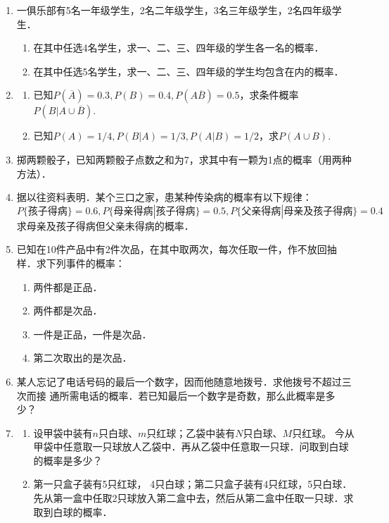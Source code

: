 \documentclass[10pt,a4paper]{article}
\begin{document}
\begin{enumerate}
    \item 一俱乐部有5名一年级学生，2名二年级学生，3名三年级学生，2名四年级学生．
    \begin{enumerate}
        \item 在其中任选4名学生，求一、二、三、四年级的学生各一名的概率．
        \item 在其中任选5名学生，求一、二、三、四年级的学生均包含在内的概率．
    \end{enumerate}


    \item \begin{enumerate}
        \item 已知$P(\overline{A})=0.3,P(B)=0.4,P(A\overline{B})=0.5$，求条件概率$P(B|A\cup \overline{B})$.
        \item 已知$P(A)=1/4,P(B|A)=1/3,P(A|B)=1/2$，求$P(A\cup B)$.
    \end{enumerate}


    \item 掷两颗骰子，已知两颗骰子点数之和为7，求其中有一颗为1点的概率（用两种方法）．
    

    \item 据以往资料表明．某个三口之家，患某种传染病的概率有以下规律：
    $$P\{\mbox{孩子得病}\}=0.6,P\{\mbox{母亲得病}|\mbox{孩子得病}\}=0.5,P\{\mbox{父亲得病}|\mbox{母亲及孩子得病}\}=0.4$$
    求母亲及孩子得病但父亲未得病的概率．


    \item 已知在10件产品中有2件次品，在其中取两次，每次任取一件，作不放回抽样．求下列事件的概率：
    \begin{enumerate}
        \item 两件都是正品．
        \item 两件都是次品．
        \item 一件是正品，一件是次品．
        \item 第二次取出的是次品．
    \end{enumerate}


    \item 某人忘记了电话号码的最后一个数字，因而他随意地拨号．求他拨号不超过三次而接
    通所需电话的概率．若已知最后一个数字是奇数，那么此概率是多少？


    \item \begin{enumerate}
        \item 设甲袋中装有$n$只白球、$m$只红球；乙袋中装有$N$只白球、$M$只红球。
        今从甲袋中任意取一只球放人乙袋中．再从乙袋中任意取一只球．问取到白球的概率是多少？
        \item 第一只盒子装有5只红球， 4只白球；第二只盒子装有4只红球，5只白球． 
        先从第一盒中任取2只球放入第二盒中去，然后从第二盒中任取一只球．求取到白球的概率．
    \end{enumerate}



\end{enumerate}
\end{document}
